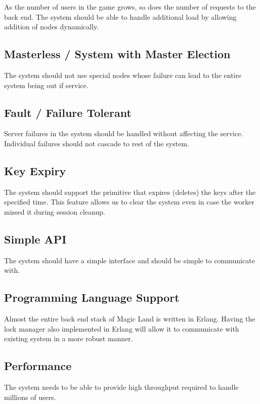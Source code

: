 As the number of users in the game grows, so does the number of requests to
the back end. The system should be able to handle additional load by allowing
addition of nodes dynamically.


\subsection{Masterless / System with Master Election}


The system should not use special nodes whose failure can lead to the
entire system being out if service.

\subsection{Fault / Failure Tolerant}


Server failures in the system should be handled without affecting the service.
Individual failures should not cascade to rest of the system.

\subsection{Key Expiry}


The system should support the primitive that expires (deletes) the keys after
the specified time. This feature allows us to clear the system even in case
the worker missed it during session cleanup.

\subsection{Simple API}


The system should have a simple interface and should be simple to communicate
with.

\subsection{Programming Language Support}


Almost the entire back end stack of Magic Land is written in Erlang. Having the
lock manager also implemented in Erlang will allow it to communicate with
existing system in a more robust manner.

\subsection{Performance}


The system needs to be able to provide high throughput required to handle
millions of users.

